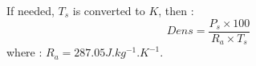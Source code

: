 If needed, $T_s$ is converted to $K$, then : 
\[
Dens = \frac{P_s\times 100}{R_a \times T_s}
\]
where : $R_a = 287.05 J.kg^{-1}.K^{-1} $.
